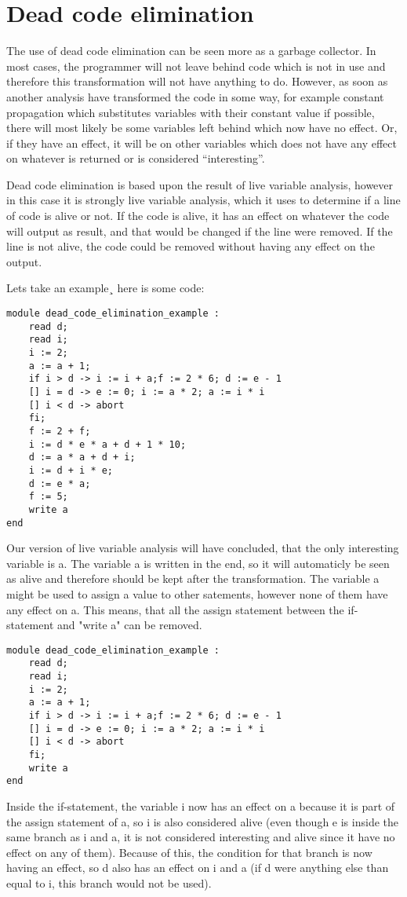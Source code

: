 \section{Dead code elimination}

The use of dead code elimination can be seen more as a garbage collector. In most cases, the programmer will not leave behind code which is not in use and therefore this transformation will not have anything to do. However, as soon as another analysis have transformed the code in some way, for example constant propagation which substitutes variables with their constant value if possible, there will most likely be some variables left behind which now have no effect. Or, if they have an effect, it will be on other variables which does not have any effect on whatever is returned or is considered ``interesting''.

Dead code elimination is based upon the result of live variable analysis, however in this case it is strongly live variable analysis, which it uses to determine if a line of code is alive or not. If the code is alive, it has an effect on whatever the code will output as result, and that would be changed if the line were removed. If the line is not alive, the code could be removed without having any effect on the output.

Lets take an example¸ here is some code:
\begin{lstlisting}
module dead_code_elimination_example :
	read d;
	read i;
	i := 2;
	a := a + 1;
	if i > d -> i := i + a;f := 2 * 6; d := e - 1
	[] i = d -> e := 0; i := a * 2; a := i * i
	[] i < d -> abort
	fi;
	f := 2 + f;
	i := d * e * a + d + 1 * 10;
	d := a * a + d + i;
	i := d + i * e;
	d := e * a;
	f := 5;
	write a
end
\end{lstlisting}
Our version of live variable analysis will have concluded, that the only interesting variable is a. The variable a is written in the end, so it will automaticly be seen as alive and therefore should be kept after the transformation. The variable a might be used to assign a value to other satements, however none of them have any effect on a. This means, that all the assign statement between the if-statement and "write a" can be removed.
\begin{lstlisting}
module dead_code_elimination_example :
	read d;
	read i;
	i := 2;
	a := a + 1;
	if i > d -> i := i + a;f := 2 * 6; d := e - 1
	[] i = d -> e := 0; i := a * 2; a := i * i
	[] i < d -> abort
	fi;
	write a
end
\end{lstlisting}
Inside the if-statement, the variable i now has an effect on a because it is part of the assign statement of a, so i is also considered alive (even though e is inside the same branch as i and a, it is not considered interesting and alive since it have no effect on any of them). Because of this, the condition for that branch is now having an effect, so d also has an effect on i and a (if d were anything else than equal to i, this branch would not be used).

